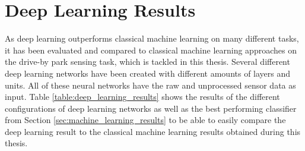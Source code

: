 



\section{Deep Learning Results}
\label{sec:deep_learning_results}

As deep learning outperforms classical machine learning on many different tasks, it has been evaluated and compared to classical machine learning approaches on the drive-by park sensing task, which is tackled in this thesis. Several different deep learning networks have been created with different amounts of layers and units. All of these neural networks have the raw and unprocessed sensor data as input. Table \ref{table:deep_learning_results} shows the results of the different configurations of deep learning networks as well as the best performing classifier from Section \ref{sec:machine_learning_results} to be able to easily compare the deep learning result to the classical machine learning results obtained during this thesis.



\begin{table}



\caption{Overall accuracy and results for the \emph{parking car}-class of different configurations of deep learning models applied on the full and filtered dataset compared to the best classical machine learning model (random forest).}
\label{table:deep_learning_results}
\end{table}


